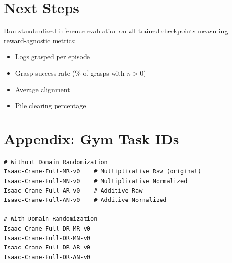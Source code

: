 \documentclass[11pt]{article}
\begin{document}
\section{Next Steps}

Run standardized inference evaluation on all trained checkpoints measuring reward-agnostic metrics:
\begin{itemize}
    \item Logs grasped per episode
    \item Grasp success rate (\% of grasps with $n > 0$)
    \item Average alignment
    \item Pile clearing percentage
\end{itemize}

\section{Appendix: Gym Task IDs}

\begin{verbatim}
# Without Domain Randomization
Isaac-Crane-Full-MR-v0    # Multiplicative Raw (original)
Isaac-Crane-Full-MN-v0    # Multiplicative Normalized
Isaac-Crane-Full-AR-v0    # Additive Raw
Isaac-Crane-Full-AN-v0    # Additive Normalized

# With Domain Randomization
Isaac-Crane-Full-DR-MR-v0
Isaac-Crane-Full-DR-MN-v0
Isaac-Crane-Full-DR-AR-v0
Isaac-Crane-Full-DR-AN-v0
\end{verbatim}
\end{document}
